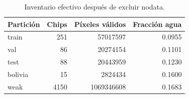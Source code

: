 \begin{table}[H]\centering\small
\caption{Inventario efectivo después de excluir nodata.}
\begin{tabular}{lrrr}
\toprule
Partición & Chips & Píxeles válidos & Fracción agua \\
\midrule
train & 251 & 57017597 & 0.0955 \\
val & 86 & 20274154 & 0.1101 \\
test & 88 & 20443959 & 0.1230 \\
bolivia & 15 & 2824434 & 0.1600 \\
weak & 4150 & 1069346608 & 0.1683 \\
\bottomrule
\end{tabular}
\end{table}
